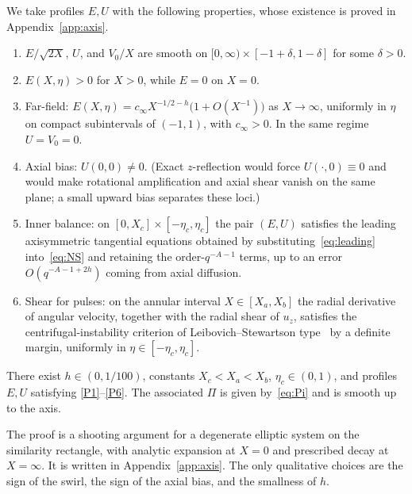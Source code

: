 \begin{construction}
\label{con:profiles}
We take profiles $E,U$ with the following properties, whose existence is proved in Appendix~\ref{app:axis}.
\begin{enumerate}[label=\textup{(P\arabic*)}]
\item \label{P1} $E/\sqrt{2X}$, $U$, and $V_0/X$ are smooth on $[0,\infty)\times[-1+\delta,1-\delta]$ for some $\delta>0$.
\item \label{P2} $E(X,\eta)>0$ for $X>0$, while $E=0$ on $X=0$.
\item \label{P3} Far-field: $E(X,\eta)=c_\infty X^{-1/2-h}\bigl(1+O(X^{-1})\bigr)$ as $X\to\infty$, uniformly in $\eta$ on compact subintervals of $(-1,1)$, with $c_\infty>0$. In the same regime $U=V_0=0$.
\item \label{P4} Axial bias: $U(0,0)\neq 0$. (Exact $z$-reflection would force $U(\cdot,0)\equiv 0$ and would make rotational amplification and axial shear vanish on the same plane; a small upward bias separates these loci.)
\item \label{P5} Inner balance: on $[0,X_c]\times[-\eta_c,\eta_c]$ the pair $(E,U)$ satisfies the leading axisymmetric tangential equations obtained by substituting~\eqref{eq:leading} into~\eqref{eq:NS} and retaining the order-$q^{-A-1}$ terms, up to an error $O(q^{-A-1+2h})$ coming from axial diffusion.
\item \label{P6} Shear for pulses: on the annular interval $X\in[X_a,X_b]$ the radial derivative of angular velocity, together with the radial shear of $u_z$, satisfies the centrifugal-instability criterion of {L}eibovich--{S}tewartson type~\cite{leibovichstewartson1978,billantgallaire} by a definite margin, uniformly in $\eta\in[-\eta_c,\eta_c]$.
\end{enumerate}
\end{construction}

\begin{proposition}
\label{prop:profiles}
There exist $h\in(0,1/100)$, constants $X_c<X_a<X_b$, $\eta_c\in(0,1)$, and profiles $E,U$ satisfying \ref{P1}--\ref{P6}. The associated $\Pi$ is given by~\eqref{eq:Pi} and is smooth up to the axis.
\end{proposition}

The proof is a shooting argument for a degenerate elliptic system on the similarity rectangle, with analytic expansion at $X=0$ and prescribed decay at $X=\infty$. It is written in Appendix~\ref{app:axis}. The only qualitative choices are the sign of the swirl, the sign of the axial bias, and the smallness of $h$.

